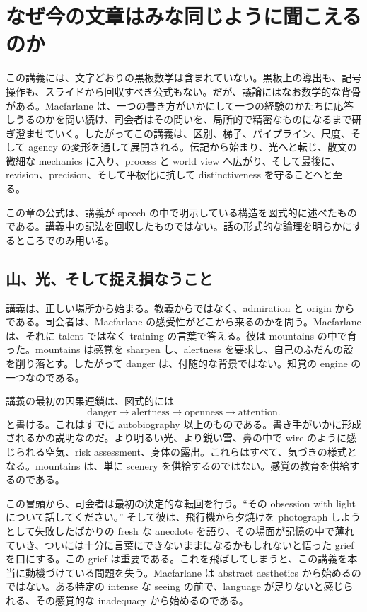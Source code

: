 \chapter{なぜ今の文章はみな同じように聞こえるのか}

この講義には、文字どおりの黒板数学は含まれていない。黒板上の導出も、記号操作も、スライドから回収すべき公式もない。だが、議論にはなお数学的な背骨がある。Macfarlane は、一つの書き方がいかにして一つの経験のかたちに応答しうるのかを問い続け、司会者はその問いを、局所的で精密なものになるまで研ぎ澄ませていく。したがってこの講義は、区別、梯子、パイプライン、尺度、そして agency の変形を通して展開される。伝記から始まり、光へと転じ、散文の微細な mechanics に入り、process と world view へ広がり、そして最後に、revision、precision、そして平板化に抗して distinctiveness を守ることへと至る。

\begin{remark}
この章の公式は、講義が speech の中で明示している構造を図式的に述べたものである。講義中の記法を回収したものではない。話の形式的な論理を明らかにするところでのみ用いる。
\end{remark}

\section{山、光、そして捉え損なうこと}

講義は、正しい場所から始まる。教義からではなく、admiration と origin からである。司会者は、Macfarlane の感受性がどこから来るのかを問う。Macfarlane は、それに talent ではなく training の言葉で答える。彼は mountains の中で育った。mountains は感覚を sharpen し、alertness を要求し、自己のふだんの殻を削り落とす。したがって danger は、付随的な背景ではない。知覚の engine の一つなのである。

講義の最初の因果連鎖は、図式的には
\begin{equation}
\text{danger} \longrightarrow \text{alertness} \longrightarrow \text{openness} \longrightarrow \text{attention}.
\end{equation}
と書ける。これはすでに autobiography 以上のものである。書き手がいかに形成されるかの説明なのだ。より明るい光、より鋭い雪、鼻の中で wire のように感じられる空気、risk assessment、身体の露出。これらはすべて、気づきの様式となる。mountains は、単に scenery を供給するのではない。感覚の教育を供給するのである。

この冒頭から、司会者は最初の決定的な転回を行う。``その obsession with light について話してください。'' そして彼は、飛行機から夕焼けを photograph しようとして失敗したばかりの fresh な anecdote を語り、その場面が記憶の中で薄れていき、ついには十分に言葉にできないままになるかもしれないと悟った grief を口にする。この grief は重要である。これを飛ばしてしまうと、この講義を本当に動機づけている問題を失う。Macfarlane は abstract aesthetics から始めるのではない。ある特定の intense な seeing の前で、language が足りないと感じられる、その感覚的な inadequacy から始めるのである。

